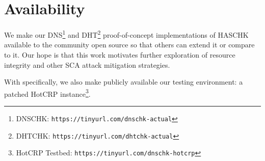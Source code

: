 \section{Availability} \label{sec:availability}

We make our DNS\footnote{DNSCHK: \texttt{https://tinyurl.com/dnschk-actual}} and
DHT\footnote{DHTCHK: \texttt{https://tinyurl.com/dhtchk-actual}}
proof-of-concept implementations of HASCHK available to the community open
source so that others can extend it or compare to it. Our hope is that this work
motivates further exploration of resource integrity and other SCA attack
mitigation strategies.

With \DNSSYS{} specifically, we also make publicly available our testing
environment: a patched HotCRP instance\footnote{HotCRP Testbed:
\texttt{https://tinyurl.com/dnschk-hotcrp}}.
